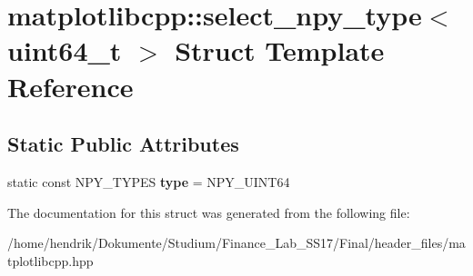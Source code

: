 \hypertarget{structmatplotlibcpp_1_1select__npy__type_3_01uint64__t_01_4}{}\section{matplotlibcpp\+:\+:select\+\_\+npy\+\_\+type$<$ uint64\+\_\+t $>$ Struct Template Reference}
\label{structmatplotlibcpp_1_1select__npy__type_3_01uint64__t_01_4}
\subsection*{Static Public Attributes}
\begin{DoxyCompactItemize}
\item 
static const N\+P\+Y\+\_\+\+T\+Y\+P\+ES {\bfseries type} = N\+P\+Y\+\_\+\+U\+I\+N\+T64\hypertarget{structmatplotlibcpp_1_1select__npy__type_3_01uint64__t_01_4_a8d5871452f90ff04452f0416bee54fca}{}\label{structmatplotlibcpp_1_1select__npy__type_3_01uint64__t_01_4_a8d5871452f90ff04452f0416bee54fca}

\end{DoxyCompactItemize}


The documentation for this struct was generated from the following file\+:\begin{DoxyCompactItemize}
\item 
/home/hendrik/\+Dokumente/\+Studium/\+Finance\+\_\+\+Lab\+\_\+\+S\+S17/\+Final/header\+\_\+files/matplotlibcpp.\+hpp\end{DoxyCompactItemize}
